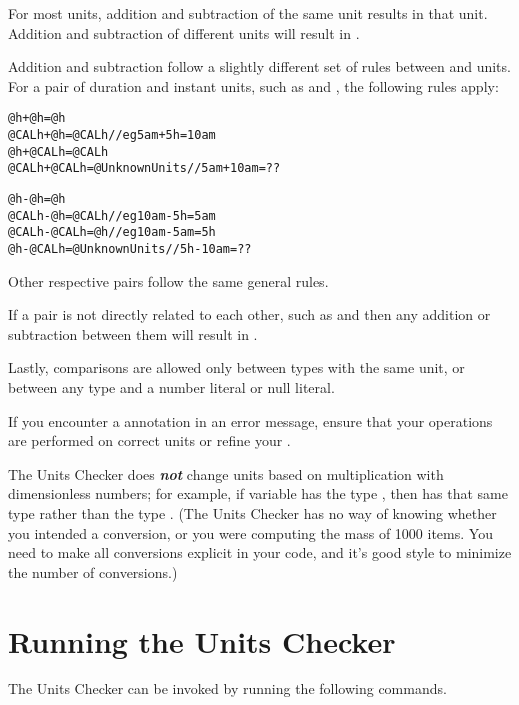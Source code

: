 For most units, addition and subtraction of the same unit results in that unit.
Addition and subtraction of different units will result in .

Addition and subtraction follow a slightly different set of rules between
 and  units. For a pair of duration and
instant units, such as  and , the following rules apply:

\begin{alltt}
@h + @h = @h
@CALh + @h = @CALh // eg 5am + 5h = 10am
@h + @CALh = @CALh
@CALh + @CALh = @UnknownUnits  // 5am + 10am = ??

@h - @h = @h
@CALh - @h = @CALh // eg 10am - 5h = 5am
@CALh - @CALh = @h // eg 10am - 5am = 5h
@h - @CALh = @UnknownUnits  // 5h - 10am = ??
\end{alltt}

Other respective pairs follow the same general rules.

If a pair is not directly related to each other, such as  and
 then any addition or subtraction between them will result in
.

Lastly, comparisons are allowed only between types with the same unit, or
between any type and a number literal or null literal.

If you encounter a  annotation in an error message, ensure
that your operations are performed on correct units or refine your
.

The Units Checker does \textbf{\emph{not}} change units based on multiplication
with dimensionless numbers; for example, if variable  has the type
, then  has that same type rather than the
type . (The Units Checker has no way of knowing whether you
intended a conversion, or you were computing the mass of 1000 items. You need to
make all conversions explicit in your code, and it's good style to minimize the
number of conversions.)

\section{Running the Units Checker\label{units-running}}

The Units Checker can be invoked by running the following commands.

